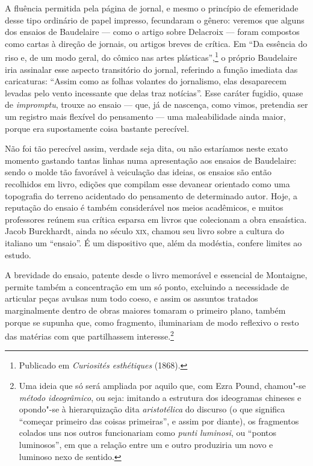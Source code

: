 A fluência permitida pela página de jornal, e mesmo o princípio de
efemeridade desse tipo ordinário de papel impresso, fecundaram o
gênero: veremos que alguns dos ensaios de Baudelaire --- como o artigo
sobre Delacroix --- foram compostos como cartas à direção de jornais, ou
artigos breves de crítica. Em “Da essência do riso e, de um modo geral,
do cômico nas artes plásticas”,\footnote{ Publicado em
\textit{Curiosités esthétiques} (1868).} o próprio Baudelaire iria
assinalar esse aspecto transitório do jornal, referindo a função
imediata das caricaturas: “Assim como as folhas volantes do jornalismo,
elas desaparecem levadas pelo vento incessante que delas traz
notícias”. Esse caráter fugidio, quase de \textit{impromptu}, trouxe ao
ensaio --- que, já de nascença, como vimos, pretendia ser um registro
mais flexível do pensamento --- uma maleabilidade ainda maior, porque era
supostamente coisa bastante perecível.

Não foi tão perecível assim, verdade seja dita, ou não estaríamos neste
exato momento gastando tantas linhas numa apresentação aos ensaios de
Baudelaire: sendo o molde tão favorável à veiculação das ideias, os
ensaios são então recolhidos em livro, edições que compilam esse
devanear orientado como uma topografia do terreno acidentado do
pensamento de determinado autor. Hoje, a reputação do ensaio é também
considerável nos meios acadêmicos, e muitos professores reúnem sua
crítica esparsa em livros que colecionam a obra ensaística. Jacob Burckhardt, 
ainda no século \textsc{xix}, chamou seu livro sobre a cultura do
 italiano um “ensaio”. É um dispositivo que, além da
modéstia, confere limites ao estudo.

A brevidade do ensaio, patente desde o livro memorável e essencial de
Montaigne, permite também a concentração em um só ponto, excluindo a
necessidade de articular peças avulsas num todo coeso, e assim os
assuntos tratados marginalmente dentro de obras maiores tomaram o
primeiro plano, também porque se supunha que, como fragmento,
iluminariam de modo reflexivo o resto das matérias com que partilhassem
interesse.\footnote{ Uma ideia que só será ampliada por aquilo que, com
Ezra Pound, chamou"-se \textit{método ideogrâmico}, ou seja: imitando a  
estrutura dos ideogramas chineses e opondo"-se à hierarquização
dita \textit{aristotélica} do discurso (o que significa “começar
primeiro das coisas primeiras”, e assim por diante), os fragmentos
colados uns nos outros funcionariam como \textit{punti luminosi}, ou
“pontos luminosos”, em que a relação entre um e outro produziria um
novo e luminoso nexo de sentido.} 

